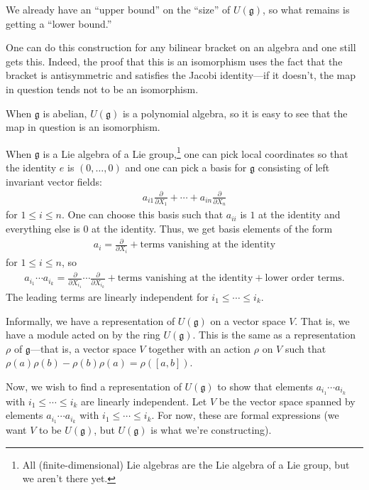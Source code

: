 \documentclass [11 pt, twoside] {article}
\begin{document}
We already have an ``upper bound'' on the ``size'' of $U(\mathfrak{g})$, so what remains is getting a ``lower bound.''

One can do this construction for any bilinear bracket on an algebra and one still gets this. 
Indeed, the proof that this is an isomorphism uses the fact that the bracket is antisymmetric and satisfies the Jacobi identity---if it doesn't, the map in question tends not to be an isomorphism.

When $\mathfrak{g}$ is abelian, $U(\mathfrak{g})$ is a polynomial algebra, so it is easy to see that the map in question is an isomorphism.

When $\mathfrak{g}$ is a Lie algebra of a Lie group,\footnote{All (finite-dimensional) Lie algebras are the Lie algebra of a Lie group, but we aren't there yet.} one can pick local coordinates so that the identity $e$ is $(0,\hdots, 0)$ and one can pick a basis for $\mathfrak{g}$ consisting of left invariant vector fields:
\begin{align*}
	a_{i1}\frac{\partial}{\partial X_1} + \cdots + a_{in}\frac{\partial}{\partial X_{n}}
\end{align*}
for $1\le i\le n$. One can choose this basis such that $a_{ii}$ is $1$ at the identity and everything else is $0$ at the identity. Thus, we get basis elements of the form
\begin{align*}
	a_{i} = \frac{\partial}{\partial X_i} + \textrm{terms vanishing at the identity} 
\end{align*}
for $1\le i\le n$, so 
\begin{align*}
	a_{i_1}\cdots a_{i_{k}} = \frac{\partial}{\partial X_{i_1}}\cdots \frac{\partial}{\partial X_{i_{k}}} + \textrm{terms vanishing at the identity} + \textrm{lower order terms.}
\end{align*}
The leading terms are linearly independent for $i_1\le \cdots\le i_{k}$.

Informally, we have a representation of $U(\mathfrak{g})$ on a vector space $V$. 
That is, we have a module acted on by the ring $U(\mathfrak{g})$.
This is the same as a representation $\rho$ of $\mathfrak{g}$---that is, a vector space $V$ together with an action $\rho$ on $V$ such that $\rho(a)\rho (b)-\rho (b)\rho (a) = \rho ([a,b])$.

Now, we wish to find a representation of $U(\mathfrak{g})$ to show that elements $a_{i_1}\cdots a_{i_{k}}$ with $i_1\le\cdots\le i_{k}$ are linearly independent.
Let $V$ be the vector space spanned by elements $a_{i_1}\cdots a_{i_{k}}$ with $i_1\le \cdots\le i_{k}$. For now, these are formal expressions (we want $V$ to be $U(\mathfrak{g})$, but $U(\mathfrak{g})$ is what we're constructing).
\end{document}
